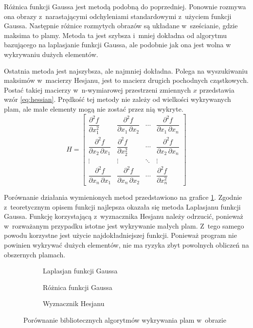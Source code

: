 Różnica funkcji Gaussa jest metodą podobną do poprzedniej.
Ponownie rozmywa ona obrazy z~narastającymi odchyleniami standardowymi
z~użyciem funkcji Gaussa.
Następnie różnice rozmytych obrazów są układane w~sześcianie, gdzie
maksima to plamy.
Metoda ta jest szybsza i~mniej dokładna od algorytmu bazującego na laplasjanie
funkcji Gaussa, ale podobnie jak ona jest wolna w wykrywaniu dużych elementów.

Ostatnia metoda jest najszybsza, ale najmniej dokładna.
Polega na wyszukiwaniu maksimów w~macierzy Hesjanu, jest to macierz
drugich pochodnych cząstkowych.
Postać takiej macierzy w~n-wymiarowej przestrzeni zmiennych $ x $ przedstawia
wzór \ref{eq:hessian}.
Prędkość tej metody nie zależy od wielkości wykrywanych plam, ale małe
elementy mogą nie zostać przez nią wykryte.
\begin{equation}
	H = \begin{bmatrix}
	\dfrac{\partial^2 f}{\partial x_1^2} & 
	\dfrac{\partial^2 f}{\partial x_1\,\partial x_2} & 
	\cdots & \dfrac{\partial^2 f}{\partial x_1\,\partial x_n} \\[2.2ex]
	\dfrac{\partial^2 f}{\partial x_2\,\partial x_1} &
	\dfrac{\partial^2 f}{\partial x_2^2} &
	\cdots & \dfrac{\partial^2 f}{\partial x_2\,\partial x_n} \\[2.2ex]
	\vdots & \vdots & \ddots & \vdots \\[2.2ex]
	\dfrac{\partial^2 f}{\partial x_n\,\partial x_1} &
	\dfrac{\partial^2 f}{\partial x_n\,\partial x_2} &
	\cdots &
	\dfrac{\partial^2 f}{\partial x_n^2}
	\end{bmatrix}
\label{eq:hessian}
\end{equation}

Porównanie działania wymienionych metod przedstawiono na grafice
\ref{fig:blobcompare}.
Zgodnie z~teoretycznym opisem funkcji najlepsza okazała się metoda
Laplasjanu funkcji Gaussa.
Funkcję korzystającą z~wyznacznika Hesjanu należy odrzucić, ponieważ
w~rozważanym przypadku istotne jest wykrywanie małych plam.
Z~tego samego powodu korzystne jest użycie najdokładniejszej funkcji.
Ponieważ program nie powinien wykrywać dużych elementów, nie ma ryzyka zbyt
powolnych obliczeń na obszernych plamach.
\begin{figure}[htb]
	\centering
	\begin{subfigure}[t]{0.3\textwidth}
		\centering
		
		\caption{Laplasjan funkcji Gaussa}
	\end{subfigure}
	\hfill
	\begin{subfigure}[t]{0.3\textwidth}
		\centering
		
		\caption{Różnica funkcji Gaussa}
	\end{subfigure}
	\hfill
	\begin{subfigure}[t]{0.3\textwidth}
		\centering
		
		\caption{Wyznacznik Hesjanu}
	\end{subfigure}
	\caption{Porównanie bibliotecznych algorytmów wykrywania plam w~obrazie}
	\label{fig:blobcompare}
\end{figure}

